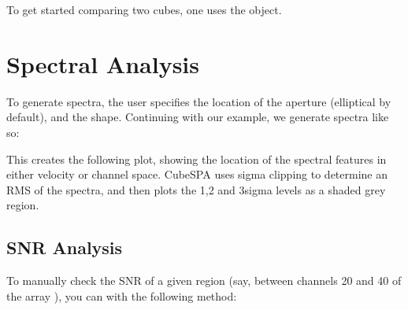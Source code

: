 \documentclass[letterpaper,10pt,english]{sphinxmanual}
\let\sphinxpxdimen\pdfpxdimen\else\newdimen\sphinxpxdimen
\begin{document}
\sphinxAtStartPar
To get started comparing two cubes, one uses the  object.

\sphinxstepscope


\section{Spectral Analysis}
\label{\detokenize{spectra:spectral-analysis}}\label{\detokenize{spectra::doc}}
\sphinxAtStartPar
To generate spectra, the user specifies the location of the aperture (elliptical by default), and the shape.
Continuing with our  example, we generate spectra like so:

\begin{sphinxVerbatim}[commandchars=\\\{\}]
    
\end{sphinxVerbatim}

\sphinxAtStartPar
This creates the following plot, showing the location of the spectral features in either velocity or channel
space. CubeSPA uses sigma clipping to determine an RMS of the spectra, and then plots the 1,2 and 3\sphinxhyphen{}sigma levels
as a shaded grey region.

\noindent\sphinxincludegraphics[width=800\sphinxpxdimen]{{blob_spectra}.png}


\subsection{SNR Analysis}
\label{\detokenize{spectra:snr-analysis}}
\sphinxAtStartPar
To manually check the SNR of a given region (say, between channels 20 and 40 of the array ),
you can with the following method:

\begin{sphinxVerbatim}[commandchars=\\\{\}]
    
    
\end{sphinxVerbatim}
\end{document}
